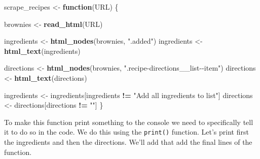 \documentclass[
  12pt,
]{book}
\newenvironment{Shaded}{\begin{snugshade}}{\end{snugshade}}
\newcommand{\ControlFlowTok}[1]{\textcolor[rgb]{0.27,0.27,0.27}{\textbf{#1}}}
\newcommand{\KeywordTok}[1]{\textcolor[rgb]{0.27,0.27,0.27}{\textbf{#1}}}
\newcommand{\NormalTok}[1]{#1}
\newcommand{\OperatorTok}[1]{\textcolor[rgb]{0.43,0.43,0.43}{\textbf{#1}}}
\newcommand{\StringTok}[1]{\textcolor[rgb]{0.5,0.5,0.5}{#1}}
\begin{document}
\begin{Shaded}
\begin{Highlighting}[]
\NormalTok{scrape\_recipes <{-}}\StringTok{ }\ControlFlowTok{function}\NormalTok{(URL) \{}
  
\NormalTok{  brownies <{-}}\StringTok{ }\KeywordTok{read\_html}\NormalTok{(URL)}
  
\NormalTok{  ingredients <{-}}\StringTok{ }\KeywordTok{html\_nodes}\NormalTok{(brownies, }\StringTok{".added"}\NormalTok{)}
\NormalTok{  ingredients <{-}}\StringTok{ }\KeywordTok{html\_text}\NormalTok{(ingredients)}
  
\NormalTok{  directions <{-}}\StringTok{ }\KeywordTok{html\_nodes}\NormalTok{(brownies, }\StringTok{".recipe{-}directions\_\_list{-}{-}item"}\NormalTok{)}
\NormalTok{  directions <{-}}\StringTok{ }\KeywordTok{html\_text}\NormalTok{(directions)}
  
\NormalTok{  ingredients <{-}}\StringTok{ }\NormalTok{ingredients[ingredients }\OperatorTok{!=}\StringTok{ "Add all ingredients to list"}\NormalTok{]}
\NormalTok{  directions <{-}}\StringTok{ }\NormalTok{directions[directions }\OperatorTok{!=}\StringTok{ ""}\NormalTok{]}
\NormalTok{\}}
\end{Highlighting}
\end{Shaded}

To make this function print something to the console we need to specifically tell it to do so in the code. We do this using the \texttt{print()} function. Let's print first the ingredients and then the directions. We'll add that add the final lines of the function.
\end{document}
